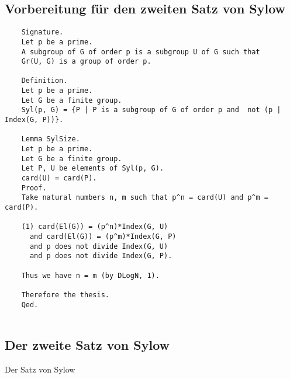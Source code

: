 \documentclass[a4paper,12pt]{scrartcl}
\begin{document}
\subsection{Vorbereitung für den zweiten Satz von Sylow}

\begin{lstlisting}
	Signature.
	Let p be a prime.
	A subgroup of G of order p is a subgroup U of G such that
	Gr(U, G) is a group of order p.
	
	Definition.
	Let p be a prime.
	Let G be a finite group.
	Syl(p, G) = {P | P is a subgroup of G of order p and  not (p | Index(G, P))}.
	
	Lemma SylSize.
	Let p be a prime.
	Let G be a finite group.
	Let P, U be elements of Syl(p, G).
	card(U) = card(P).
	Proof.
	Take natural numbers n, m such that p^n = card(U) and p^m = card(P).
	
	(1) card(El(G)) = (p^n)*Index(G, U) 
	  and card(El(G)) = (p^m)*Index(G, P) 
	  and p does not divide Index(G, U)
	  and p does not divide Index(G, P).
	
	Thus we have n = m (by DLogN, 1).
	
	Therefore the thesis.
	Qed.
	
\end{lstlisting}

\subsection{Der zweite Satz von Sylow}

Der Satz von Sylow
\end{document}
